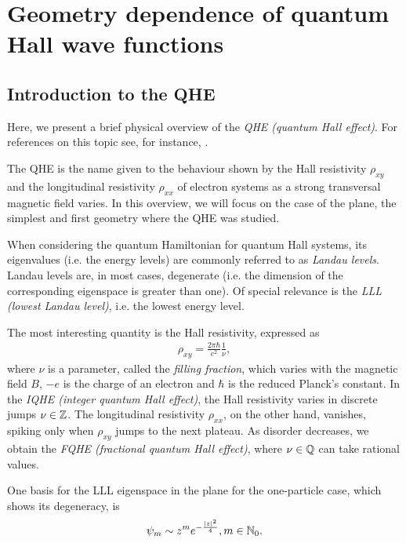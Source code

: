 \documentclass[notas.tex]{subfiles}
\begin{document}
\chapter{Geometry dependence of quantum Hall wave functions} \label{sec_geometry_dependence}

\section{Introduction to the QHE} \label{sec_intro_qhe} 

Here, we present a brief physical overview of the \emph{QHE (quantum Hall effect)}. For references on this topic see, for instance, \cite{jain_composite_2007, yoshioka_quantum_2002}.

The QHE is the name given to the behaviour shown by the Hall resistivity $\rho_{xy}$ and the longitudinal resistivity $\rho_{xx}$ of electron systems as a strong transversal magnetic field varies. In this overview, we will focus on the case of the plane, the simplest and first geometry where the QHE was studied. 

When considering the quantum Hamiltonian for quantum Hall systems, its eigenvalues (i.e. the energy levels) are commonly referred to as \emph{Landau levels}. Landau levels are, in most cases, degenerate (i.e. the dimension of the corresponding eigenspace is greater than one). Of special relevance is the \emph{LLL (lowest Landau level)}, i.e. the lowest energy level. 

The most interesting quantity is the Hall resistivity, expressed as
\begin{align*}
	\rho_{xy} = \frac{2 \pi \hbar}{e^2} \frac{1}{\nu},
\end{align*}
where $\nu$ is a parameter, called the \emph{filling fraction}, which varies with the magnetic field $B$, $-e$ is the charge of an electron and $\hbar$ is the reduced Planck's constant. In the \emph{IQHE (integer quantum Hall effect)}, the Hall resistivity varies in discrete jumps $\nu \in \mathbb{Z}$. The longitudinal resistivity $\rho_{xx}$, on the other hand, vanishes, spiking only when $\rho_{xy}$ jumps to the next plateau. As disorder decreases, we obtain the \emph{FQHE (fractional quantum Hall effect)}, where $\nu \in \mathbb{Q}$ can take rational values. 

 One basis for the LLL eigenspace in the plane for the one-particle case, which shows its degeneracy, is
\begin{equation} \label{eq_single_wavefunction}
	\psi_m \sim z^m e^{- \frac{\left|z\right|^2}{4}}, m \in \mathbb{N}_0.
\end{equation}
\end{document}
